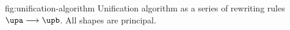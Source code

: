 \documentclass[acmsmall,screen,nonacm,review]{acmart}
\begin{document}
\begin{mathparfig}[htpb!]
  {fig:unification-algorithm}
  {Unification algorithm as a series of rewriting rules
   $\upa \unif \upb$. All shapes are principal.}
   \rewrite[U-Exists]
      {(\cexists \alpha \upa) \cand \upb \\ \tv \disjoint \upb}
      {\cexists \tv {\upa \cand \upb}}

    \rewrite[U-Cycle]
      {\up \\ \cyclic \up}
      {\cfalse}

    \rewrite[U-True]
      {\up \cand \ctrue}
      {\up}

    \rewrite[U-False]
      {\Up\where\cfalse \\ \Up \neq \square}
      {\cfalse}

    \rewrite[U-Merge]
      {\cunif \tv \ueqa \cand \cunif \tv \ueqb}
      {\cunif \tv {\cunif \ueqa \ueqb}}

    \rewrite[U-Stutter]
      {\cunif \tv {\cunif \tv \ueq}}
      {\cunif \tv \ueq}

    \rewrite[U-Name]
      {\cunif {\pshapp \parens{\tys, \ti, \typs}} \ueq \\ \tv \disjoint \tys, \typs, \ueq }
      {\cexists \tv {\cunif \tv \ti \cand \cunif {\pshapp \parens{\tys, \ti, \typs}} \ueq}}

    \rewrite[U-Decomp]
      {\cunif {\pshapp \tvs} {\cunif {\pshapp \tvbs} \ueq}}
      {\cunif {\pshapp \tvs} \ueq \cand \cunif \tvs \tvbs}

    \rewrite[U-Clash]
      {\cunif {\pshapp \tvs} {\cunif {\pshapp[\shp]\tvbs } \ueq }\\
       \sh \neq \shp}
      {\cfalse}

      {\ctrue}
\end{mathparfig}


\end{document}
